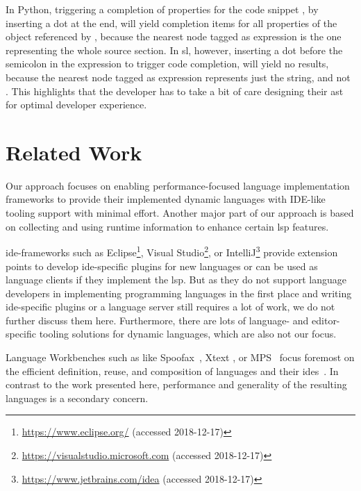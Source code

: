 \documentclass[sigplan,10pt,screen]{acmart}
\begin{document}
In Python, triggering a completion of properties for the code snippet
, by inserting a dot at the end, will yield
completion items for all properties of the object referenced by
, because the nearest node tagged as
expression is the one representing the whole source section. In \ac{sl},
however, inserting a dot before the semicolon in the expression
 to trigger code completion, will yield no
results, because the nearest node tagged as expression represents just the
 string, and not
. This highlights that the developer has to
take a bit of care designing their \ac{ast} for optimal developer experience.

\section{Related Work}
\label{cha:relatedwork}

Our approach focuses on enabling performance-focused language implementation
frameworks to provide their implemented dynamic languages with IDE-like tooling
support with minimal effort. Another major part of our approach is based on
collecting and using runtime information to enhance certain \ac{lsp} features.

\acs{ide}-frameworks such as Eclipse\footnote{\url{https://www.eclipse.org/} (accessed 2018-12-17)}, Visual
Studio\footnote{\url{https://visualstudio.microsoft.com} (accessed 2018-12-17)},
or IntelliJ\footnote{\url{https://www.jetbrains.com/idea} (accessed 2018-12-17)}
provide extension points to develop \acs{ide}-specific plugins for new languages
or can be used as language clients if they implement the \ac{lsp}. But as they
do not support language developers in implementing programming languages in the
first place and writing \acs{ide}-specific plugins or a language server still
requires a lot of work, we do not further discuss them here. Furthermore, there
are lots of language- and editor-specific tooling solutions for dynamic
languages, which are also not our focus.

Language Workbenches such as like Spoofax~\cite{kats2010spoofax}, Xtext
\cite{eysholdt2010xtext}, or MPS~\cite{voelter2012language} focus foremost on
the efficient definition, reuse, and composition of languages and their
\acs{ide}s~\cite{erdweg2013state}. In contrast to the work presented here,
performance and generality of the resulting languages is a secondary concern.
\end{document}
